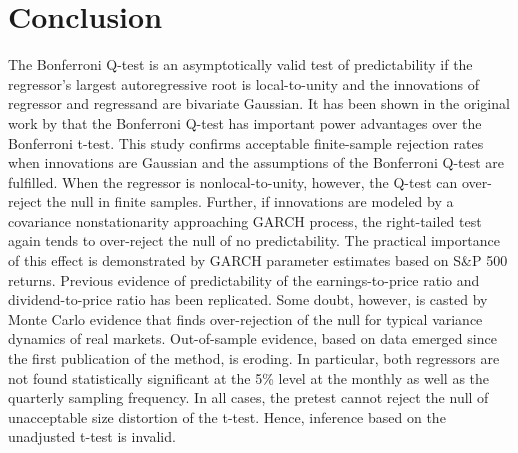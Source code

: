 \documentclass{article}
\begin{document}
\section{Conclusion}
\label{conclusion}

The Bonferroni Q-test is an asymptotically valid test of predictability if the regressor's largest autoregressive root is local-to-unity and the innovations of regressor and regressand are bivariate Gaussian. It has been shown in the original work by \citet{campbell2006efficient} that the Bonferroni Q-test has important power advantages over the Bonferroni t-test. This study confirms acceptable finite-sample rejection rates when innovations are Gaussian and the assumptions of the Bonferroni Q-test are fulfilled. When the regressor is nonlocal-to-unity, however, the Q-test can over-reject the null in finite samples. Further, if innovations are modeled by a covariance nonstationarity approaching GARCH process, the right-tailed test again tends to over-reject the null of no predictability. The practical importance of this effect is demonstrated by GARCH parameter estimates based on S\&P 500 returns. Previous evidence of predictability of the earnings-to-price ratio and dividend-to-price ratio has been replicated. Some doubt, however, is casted by Monte Carlo evidence that finds over-rejection of the null for typical variance dynamics of real markets. Out-of-sample evidence, based on data emerged since the first publication of the method, is eroding. In particular, both regressors are not found statistically significant at the 5\% level at the monthly as well as the quarterly sampling frequency. In all cases, the pretest cannot reject the null of unacceptable size distortion of the t-test. Hence, inference based on the unadjusted t-test is invalid.

\pagebreak


\end{document}

